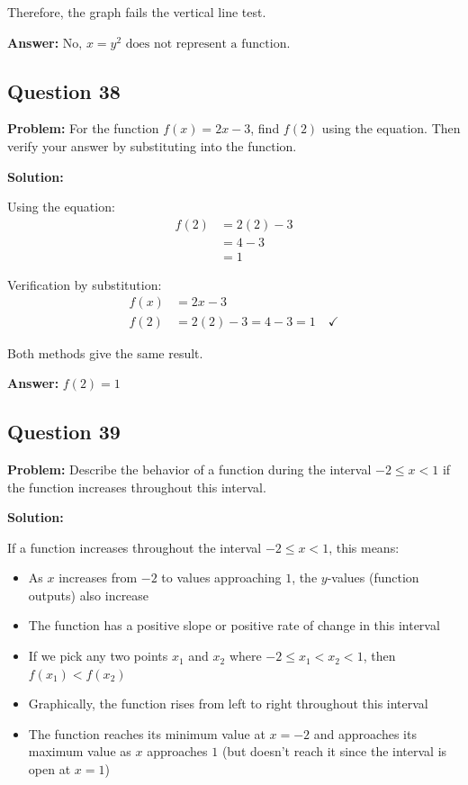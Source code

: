\documentclass[12pt]{article}
\begin{document}
Therefore, the graph fails the vertical line test.

\textbf{Answer:} $\boxed{\text{No, } x = y^2 \text{ does not represent a function.}}$

\subsection*{Question 38}
\textbf{Problem:} For the function $f(x) = 2x - 3$, find $f(2)$ using the equation. Then verify your answer by substituting into the function.

\textbf{Solution:}

Using the equation:
\begin{align*}
f(2) &= 2(2) - 3 \\
&= 4 - 3 \\
&= 1
\end{align*}

Verification by substitution:
\begin{align*}
f(x) &= 2x - 3 \\
f(2) &= 2(2) - 3 = 4 - 3 = 1 \quad \checkmark
\end{align*}

Both methods give the same result.

\textbf{Answer:} $\boxed{f(2) = 1}$

\subsection*{Question 39}
\textbf{Problem:} Describe the behavior of a function during the interval $-2 \leq x < 1$ if the function increases throughout this interval.

\textbf{Solution:}

If a function increases throughout the interval $-2 \leq x < 1$, this means:

\begin{itemize}
\item As $x$ increases from $-2$ to values approaching $1$, the $y$-values (function outputs) also increase
\item The function has a positive slope or positive rate of change in this interval
\item If we pick any two points $x_1$ and $x_2$ where $-2 \leq x_1 < x_2 < 1$, then $f(x_1) < f(x_2)$
\item Graphically, the function rises from left to right throughout this interval
\item The function reaches its minimum value at $x = -2$ and approaches its maximum value as $x$ approaches $1$ (but doesn't reach it since the interval is open at $x = 1$)
\end{itemize}
\end{document}
